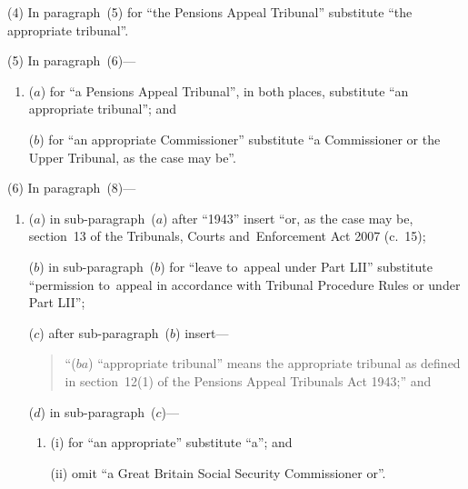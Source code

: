 \documentclass[12pt,a4paper]{article}
\begin{document}
(4) In paragraph~(5) for “the Pensions Appeal Tribunal” substitute “the appropriate tribunal”.

(5) In paragraph~(6)—
\begin{enumerate}\item[]
($a$) for “a Pensions Appeal Tribunal”, in both places, substitute “an appropriate tribunal”; and

($b$) for “an appropriate Commissioner” substitute “a Commissioner or the Upper Tribunal, as the case may be”.
\end{enumerate}

(6) In paragraph~(8)—
\begin{enumerate}\item[]
($a$) in sub-paragraph~($a$)  after “1943” insert “or, as the case may be, section~13 of the Tribunals, Courts and~Enforcement Act 2007 (c.~15);

($b$) in sub-paragraph~($b$)  for “leave to~appeal under Part LII” substitute “permission to~appeal in accordance with Tribunal Procedure Rules or under Part LII”;

($c$) after sub-paragraph~($b$)  insert—
\begin{quotation}
“($ba$) “appropriate tribunal” means the appropriate tribunal as defined in section~12(1) of the Pensions Appeal Tribunals Act 1943;” and
\end{quotation}

($d$) in sub-paragraph~($c$)—
\begin{enumerate}\item[]
(i) for “an appropriate” substitute “a”; and

(ii) omit “a Great Britain Social Security Commissioner or”.
\end{enumerate}
\end{enumerate}

\medskip
\end{document}
